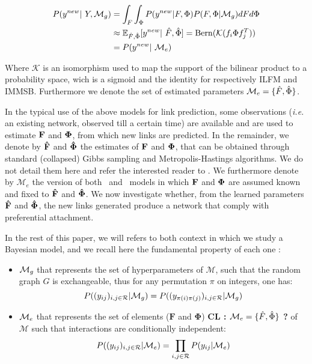 \begin{align*}
    \p(y^{new} | Y, \mg) &= \int_F \int_\Phi \p(y^{new}|F,\Phi) \p(F,\Phi|\mg) dF d\Phi \\
                          &\approx \E_{\hat F, \hat \Phi} [y^{new} | \hat F, \hat \Phi] = \mathrm{Bern}(\mathcal{K}(f_i \Phi f_j^T)) \\
                          &= \p(y^{new} | \me)
\end{align*}

Where $\mathcal{K}$ is an isomorphism used to map the support of the bilinear product to a probability space, wich is a sigmoid and the identity for respectively ILFM and IMMSB. Furthermore we denote the set of estimated parameters $\mathcal{M}_e = \{\hat F,  \hat \Phi \}$.

In the typical use of the above models for link prediction, some observations (\textit{i.e.} an existing network, observed till a certain time) are available and are used to estimate $\mathbf{F}$ and $\mathbf{\Phi}$, from which new links are predicted. In the remainder, we denote by $\mathbf{\hat{F}}$ and $\mathbf{\hat{\Phi}}$ the estimates of $\mathbf{F}$ and $\mathbf{\Phi}$, that can be obtained through standard (collapsed) Gibbs sampling and Metropolis-Hastings algorithms. We do not detail them here and refer the interested reader to \cite{ILFRM,IBP,HDP,fan2015dynamic}. We furthermore denote by $\mathcal{M}_e$ the version of both \ifm\ and \imb\ models in which $\mathbf{F}$ and $\mathbf{\Phi}$ are assumed known and fixed to $\mathbf{\hat{F}}$ and $\mathbf{\hat{\Phi}}$. We now investigate whether, from the learned parameters $\mathbf{\hat{F}}$ and $\mathbf{\hat{\Phi}}$, the new links generated produce a network that comply with preferential attachment.


In the rest of this paper, we will refers to both context in which we study a Bayesian model, and we recall here the fundamental property of each one :
\begin{itemize}
    \item $\mathcal{M}_g$ that represents the set of hyperparameters of $\mathcal{M}$, such that the random graph $G$ is exchangeable, thus for any permutation $\pi$ on integers, one has: \[ P((y_{ij})_{i,j\in \mathcal{R}} | \mathcal{M}_g) = P((y_{\pi(i)\pi(j)})_{i,j\in \mathcal{R}} | \mathcal{M}_g) \]
    \item $\mathcal{M}_e$ that represents the set of elements ($\bm{F}$ and $\bm{\Phi}$) \textbf{ CL :  $\mathcal{M}_e = \{\hat F,  \hat \Phi \}$ ?} of $\mathcal{M}$ such that interactions are conditionally independent:  \[P((y_{ij})_{i,j\in \mathcal{R}} | \mathcal{M}_e) = \prod_{i,j\in \mathcal{R}} P(y_{ij} | \mathcal{M}_e)  \]
\end{itemize}

